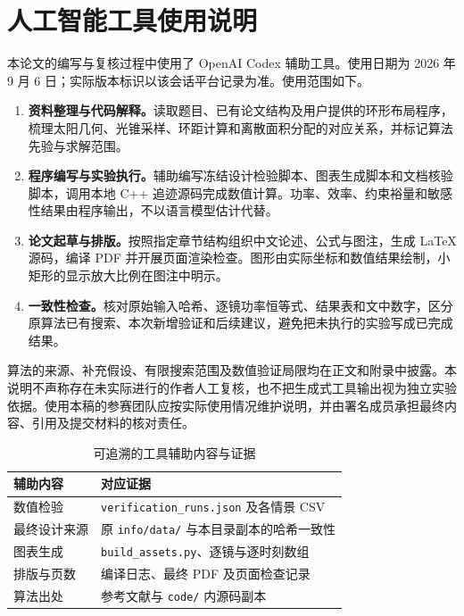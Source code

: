 \section{人工智能工具使用说明}
本论文的编写与复核过程中使用了 OpenAI Codex 辅助工具。使用日期为 2026 年 9 月 6 日；实际版本标识以该会话平台记录为准。使用范围如下。
\begin{enumerate}[label=（\arabic*）]
\item \textbf{资料整理与代码解释。}读取题目、已有论文结构及用户提供的环形布局程序，梳理太阳几何、光锥采样、环距计算和离散面积分配的对应关系，并标记算法先验与求解范围。
\item \textbf{程序编写与实验执行。}辅助编写冻结设计检验脚本、图表生成脚本和文档核验脚本，调用本地 C++ 追迹源码完成数值计算。功率、效率、约束裕量和敏感性结果由程序输出，不以语言模型估计代替。
\item \textbf{论文起草与排版。}按照指定章节结构组织中文论述、公式与图注，生成 LaTeX 源码，编译 PDF 并开展页面渲染检查。图形由实际坐标和数值结果绘制，小矩形的显示放大比例在图注中明示。
\item \textbf{一致性检查。}核对原始输入哈希、逐镜功率恒等式、结果表和文中数字，区分原算法已有搜索、本次新增验证和后续建议，避免把未执行的实验写成已完成结果。
\end{enumerate}
算法的来源、补充假设、有限搜索范围及数值验证局限均在正文和附录中披露。本说明不声称存在未实际进行的作者人工复核，也不把生成式工具输出视为独立实验依据。使用本稿的参赛团队应按实际使用情况维护说明，并由署名成员承担最终内容、引用及提交材料的核对责任。

\begin{table}[H]\centering\small
\caption{可追溯的工具辅助内容与证据}
\begin{tabular}{p{49mm}p{96mm}}\toprule
辅助内容 & 对应证据\\\midrule
数值检验 & \texttt{verification\_runs.json} 及各情景 CSV\\
最终设计来源 & 原 \texttt{info/data/} 与本目录副本的哈希一致性\\
图表生成 & \texttt{build\_assets.py}、逐镜与逐时刻数组\\
排版与页数 & 编译日志、最终 PDF 及页面检查记录\\
算法出处 & 参考文献与 \texttt{code/} 内源码副本\\
\bottomrule\end{tabular}\end{table}
